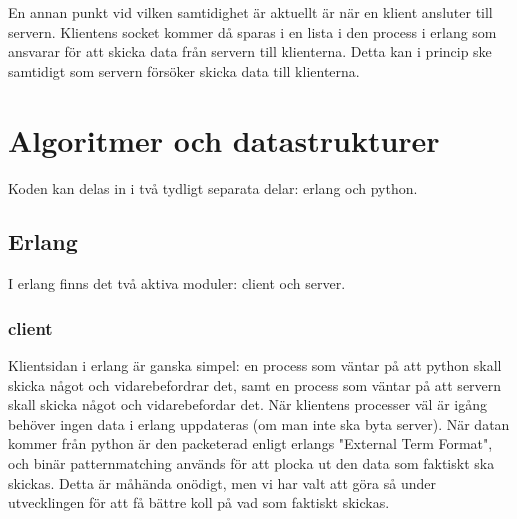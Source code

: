 \documentclass{scrartcl}
\begin{document}
\smallskip
En annan punkt vid vilken samtidighet är aktuellt är när en klient ansluter till servern. Klientens socket kommer då sparas i en lista i den process i erlang som ansvarar för att skicka data från servern till klienterna. Detta kan i princip ske samtidigt som servern försöker skicka data till klienterna.

\smallskip
\section{Algoritmer och datastrukturer}
Koden kan delas in i två tydligt separata delar: erlang och python.

\subsection{Erlang}
I erlang finns det två aktiva moduler: client och server.

\subsubsection{client}
Klientsidan i erlang är ganska simpel: en process som väntar på att python skall skicka något och vidarebefordrar det, samt en process som väntar på att servern skall skicka något och vidarebefordar det. När klientens processer väl är igång behöver ingen data i erlang uppdateras (om man inte ska byta server). När datan kommer från python är den packeterad enligt erlangs "External Term Format", och binär patternmatching används för att plocka ut den data som faktiskt ska skickas. Detta är måhända onödigt, men vi har valt att göra så under utvecklingen för att få bättre koll på vad som faktiskt skickas.

\smallskip
\end{document}
